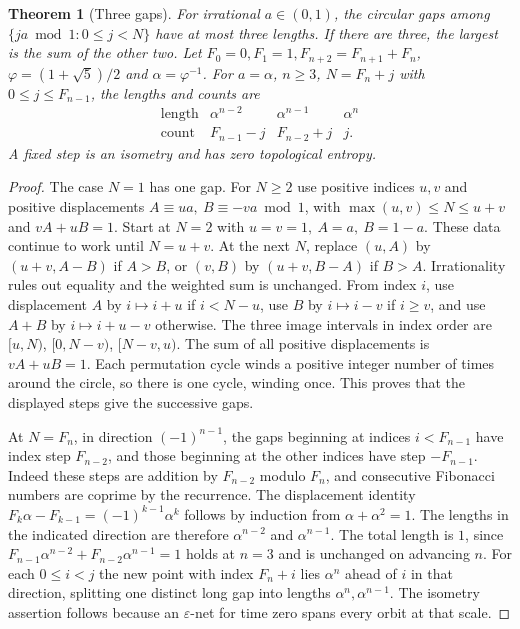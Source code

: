 \documentclass[11pt,reqno]{amsart}
\newtheorem{theorem}{Theorem}[section]
\theoremstyle{definition}
\theoremstyle{remark}
\numberwithin{equation}{section}
\begin{document}
\begin{theorem}[Three gaps]\label{m9:three-gaps}
For irrational \(a\in(0,1)\), the circular gaps among
\(\{ja\bmod1:0\le j<N\}\) have at most three lengths. If there are
three, the largest is the sum of the other two.
Let \(F_0=0,F_1=1,F_{n+2}=F_{n+1}+F_n\),
\(\varphi=(1+\sqrt5)/2\) and \(\alpha=\varphi^{-1}\).
For \(a=\alpha\), \(n\ge3\), \(N=F_n+j\) with \(0\le j\le F_{n-1}\),
the lengths and counts are
\[
\begin{array}{c|ccc}
\text{length} & \alpha^{n-2}&\alpha^{n-1}&\alpha^n\\
\text{count}& F_{n-1}-j & F_{n-2}+j & j .
\end{array}
\]
A fixed step is an isometry and has zero topological entropy.
\end{theorem}
\begin{proof}
The case \(N=1\) has one gap. For \(N\ge2\) use positive indices \(u,v\)
and positive displacements \(A\equiv ua,\ B\equiv-va\bmod1\), with
\(\max(u,v)\le N\le u+v\) and \(vA+uB=1\).
Start at \(N=2\) with \(u=v=1,\ A=a,\ B=1-a\).
These data continue to work until \(N=u+v\).
At the next \(N\), replace \((u,A)\) by \((u+v,A-B)\) if \(A>B\),
or \((v,B)\) by \((u+v,B-A)\) if \(B>A\). Irrationality rules
out equality and the weighted sum is unchanged. From index \(i\),
use displacement \(A\) by \(i\mapsto i+u\) if \(i<N-u\), use
\(B\) by \(i\mapsto i-v\) if \(i\ge v\), and use \(A+B\) by
\(i\mapsto i+u-v\) otherwise. The three image intervals in index
order are \([u,N)\), \([0,N-v)\), \([N-v,u)\).
The sum of all positive displacements is \(vA+uB=1\).
Each permutation cycle winds a positive integer number of times
around the circle, so there is one cycle, winding once. This proves
that the displayed steps give the successive gaps.

At \(N=F_n\), in direction \((-1)^{n-1}\), the gaps beginning at
indices \(i<F_{n-1}\) have index step \(F_{n-2}\), and those
beginning at the other indices have step \(-F_{n-1}\).
Indeed these steps are addition by \(F_{n-2}\) modulo \(F_n\),
and consecutive Fibonacci numbers are coprime by the recurrence.
The displacement identity
\(F_k\alpha-F_{k-1}=(-1)^{k-1}\alpha^k\) follows by induction
from \(\alpha+\alpha^2=1\). The lengths in the indicated direction
are therefore \(\alpha^{n-2}\) and \(\alpha^{n-1}\).
The total length is \(1\), since
\(F_{n-1}\alpha^{n-2}+F_{n-2}\alpha^{n-1}=1\) holds at \(n=3\)
and is unchanged on advancing \(n\). For each \(0\le i<j\) the new
point with index \(F_n+i\) lies \(\alpha^n\) ahead of \(i\) in that
direction, splitting one distinct long gap into lengths
\(\alpha^n,\alpha^{n-1}\). The isometry assertion follows because
an \(\varepsilon\)-net for time zero spans every orbit at that scale.
\end{proof}
\end{document}
